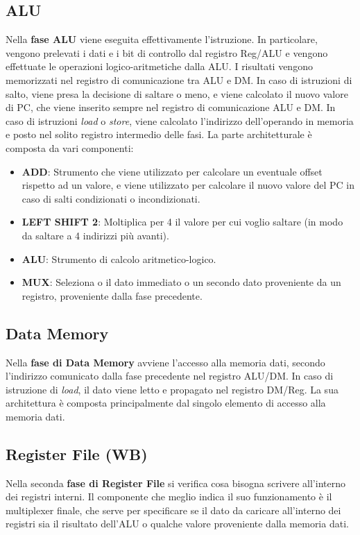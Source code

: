 \subsection{ALU}
Nella \textbf{fase ALU} viene eseguita effettivamente l'istruzione. In particolare, vengono prelevati i dati e i bit di controllo dal registro Reg/ALU e vengono effettuate le operazioni logico-aritmetiche dalla ALU. I risultati vengono memorizzati nel registro di comunicazione tra ALU e DM. In caso di istruzioni di salto, viene presa la decisione di saltare o meno, e viene calcolato il nuovo valore di PC, che viene inserito sempre nel registro di comunicazione ALU e DM. In caso di istruzioni \textit{load} o \textit{store}, viene calcolato l'indirizzo dell'operando in memoria e posto nel solito registro intermedio delle fasi. 
La parte architetturale è composta da vari componenti:
\begin{itemize}
    \item \textbf{ADD}: Strumento che viene utilizzato per calcolare un eventuale offset rispetto ad un valore, e viene utilizzato per calcolare il nuovo valore del PC in caso di salti condizionati o incondizionati.
    \item \textbf{LEFT SHIFT 2}: Moltiplica per 4 il valore per cui voglio saltare (in modo da saltare a 4 indirizzi più avanti).
    \item \textbf{ALU}: Strumento di calcolo aritmetico-logico.
    \item \textbf{MUX}: Seleziona o il dato immediato o un secondo dato proveniente da un registro, proveniente dalla fase precedente.
\end{itemize}

\subsection{Data Memory}
Nella \textbf{fase di Data Memory} avviene l'accesso alla memoria dati, secondo l'indirizzo comunicato dalla fase precedente nel registro ALU/DM. In caso di istruzione di \textit{load}, il dato viene letto e propagato nel registro DM/Reg. La sua architettura è composta principalmente dal singolo elemento di accesso alla memoria dati.

\subsection{Register File (WB)}
Nella seconda \textbf{fase di Register File} si verifica cosa bisogna scrivere all'interno dei registri interni. Il componente che meglio indica il suo funzionamento è il multiplexer finale, che serve per specificare se il dato da caricare all'interno dei registri sia il risultato dell'ALU o qualche valore proveniente dalla memoria dati. 


